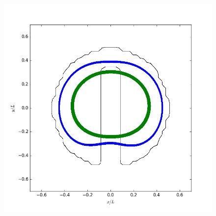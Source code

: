 \documentclass{ws-ijcm}
\begin{document}


\begin{figure}
  \centering
  \begin{minipage}{0.45\textwidth}
      \includegraphics[width=\textwidth]{contours_delta}
  \end{minipage}
  \quad
  \begin{minipage}{0.45\textwidth}

\end{minipage}
\end{figure}
\end{document}
